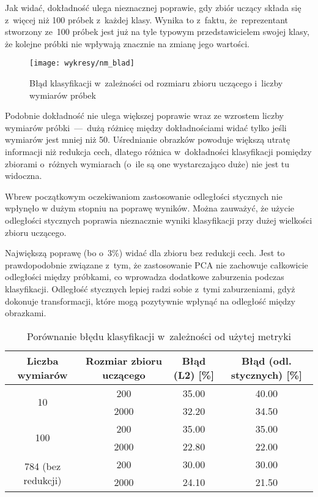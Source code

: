 \documentclass[12pt]{article}
\begin{document}
Jak widać, dokładność ulega nieznacznej poprawie, gdy zbiór uczący składa się z~więcej niż 100 próbek z~każdej klasy. Wynika to z~faktu, że~reprezentant stworzony ze~100 próbek jest 
już na tyle typowym przedstawicielem swojej klasy, że kolejne próbki nie wpływają znacznie na zmianę jego wartości.
  
\begin{figure}[H]
 \centering
 \texttt{[image: wykresy/nm\_blad]}
 \caption{Błąd klasyfikacji w~zależności od rozmiaru zbioru uczącego i~liczby wymiarów próbek}
\label{fig:blad nm}
\end{figure}
Podobnie dokładność nie ulega większej poprawie wraz ze wzrostem liczby wymiarów próbki~---~dużą różnicę między dokładnościami widać tylko jeśli wymiarów jest mniej niż 50.
Uśrednianie obrazków powoduje większą utratę informacji niż redukcja cech, dlatego różnica w~dokładności klasyfikacji pomiędzy zbiorami o~różnych wymiarach (o~ile są one wystarczająco duże) nie jest tu widoczna.

Wbrew początkowym oczekiwaniom zastosowanie odległości stycznych nie wpłynęło w dużym stopniu na poprawę wyników. 
Można zauważyć, że użycie odległości stycznych poprawia nieznacznie wyniki klasyfikacji przy dużej wielkości zbioru uczącego.

Największą poprawę (bo o~3\%)
widać dla zbioru bez redukcji cech. Jest to prawdopodobnie związane z~tym, że zastosowanie PCA nie zachowuje całkowicie odległości między próbkami,
co wprowadza dodatkowe zaburzenia podczas klasyfikacji. Odległość stycznych lepiej radzi sobie z~tymi zaburzeniami, gdyż dokonuje transformacji,
 które mogą pozytywnie wpłynąć na odległość między obrazkami.  
\begin{table}[H]
  \begin{tabular}[H]{|c|c|c|c|}
  \hline 
  \rowcolor[gray]{0.9} Liczba wymiarów & Rozmiar zbioru uczącego & Błąd (L2) [\%] & Błąd (odl. stycznych) [\%]\\ \hline \hline

  \multirow{2}{*}{10} &  200  & 35.00 & 40.00 \\ \cline{2-4} 
		      &  2000 & 32.20 & 34.50\\ \hline 

  \multirow{2}{*}{100} &  200  & 35.00 & 35.00 \\ \cline{2-4} 
		       &  2000 & 22.80 & 22.00\\ \hline 

  \multirow{2}{*}{784 (bez redukcji)} &  200 & 30.00 & 30.00 \\ \cline{2-4} 
				      &  2000 & 24.10 & 21.50\\ \hline 

  \end{tabular} 
 \caption{Porównanie błędu klasyfikacji w~zależności od użytej metryki} 
\label{tab: l2 vs tangent}
\end{table}
\end{document}
